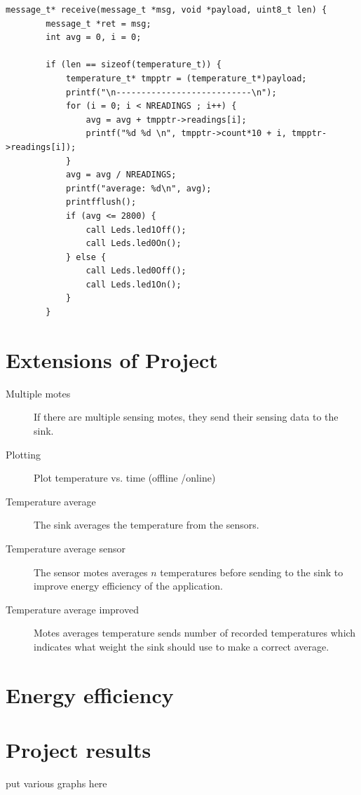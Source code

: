 \documentclass[a4paper,11pt,titlepage]{article}
\begin{document}
\begin{lstlisting}
message_t* receive(message_t *msg, void *payload, uint8_t len) {
		message_t *ret = msg;
		int avg = 0, i = 0;

		if (len == sizeof(temperature_t)) {
			temperature_t* tmpptr = (temperature_t*)payload;
			printf("\n---------------------------\n");
			for (i = 0; i < NREADINGS ; i++) {
				avg = avg + tmpptr->readings[i];
				printf("%d %d \n", tmpptr->count*10 + i, tmpptr->readings[i]);
			}
			avg = avg / NREADINGS;
			printf("average: %d\n", avg);
			printfflush();
			if (avg <= 2800) {
				call Leds.led1Off();
				call Leds.led0On();
			} else {
				call Leds.led0Off();
				call Leds.led1On();
			}
		}
\end{lstlisting}

\section{Extensions of Project}
\begin{description}
\item[Multiple motes] If there are multiple sensing motes, they send their sensing data to the sink.
\item[Plotting] Plot temperature vs. time (offline /online)
\item[Temperature average] The sink averages the temperature from the sensors.
\item[Temperature average sensor] The sensor motes averages $n$ temperatures before sending to the sink to improve energy efficiency of the application.
\item[Temperature average improved] Motes averages temperature sends number of recorded temperatures which indicates what weight the sink should use to make a correct average.

\end{description}

\section{Energy efficiency}
\section{Project results}
put various graphs here


\newpage

\end{document}
